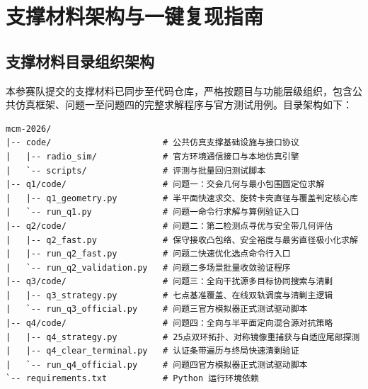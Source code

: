 \newpage
\appendix


\lstset{style=cumcmcode}

\section{支撑材料架构与一键复现指南}

\subsection{支撑材料目录组织架构}
本参赛队提交的支撑材料已同步至代码仓库，严格按题目与功能层级组织，包含公共仿真框架、问题一至问题四的完整求解程序与官方测试用例。目录架构如下：

\begin{verbatim}
mcm-2026/
|-- code/                      # 公共仿真支撑基础设施与接口协议
|   |-- radio_sim/             # 官方环境通信接口与本地仿真引擎
|   `-- scripts/               # 评测与批量回归测试脚本
|-- q1/code/                   # 问题一：交会几何与最小包围圆定位求解
|   |-- q1_geometry.py         # 半平面快速求交、旋转卡壳直径与覆盖判定核心库
|   `-- run_q1.py              # 问题一命令行求解与算例验证入口
|-- q2/code/                   # 问题二：第二检测点寻优与安全带几何评估
|   |-- q2_fast.py             # 保守接收凸包络、安全裕度与最劣直径极小化求解
|   |-- run_q2_fast.py         # 问题二快速优化选点命令行入口
|   `-- run_q2_validation.py   # 问题二多场景批量收敛验证程序
|-- q3/code/                   # 问题三：全向干扰源多目标协同搜索与清剿
|   |-- q3_strategy.py         # 七点基准覆盖、在线双轨调度与清剿主逻辑
|   `-- run_q3_official.py     # 问题三官方模拟器正式测试驱动脚本
|-- q4/code/                   # 问题四：全向与半平面定向混合源对抗策略
|   |-- q4_strategy.py         # 25点双环拓扑、对称镜像重捕获与自适应尾部探测
|   |-- q4_clear_terminal.py   # 认证条带遍历与终局快速清剿验证
|   `-- run_q4_official.py     # 问题四官方模拟器正式测试驱动脚本
`-- requirements.txt           # Python 运行环境依赖
\end{verbatim}

